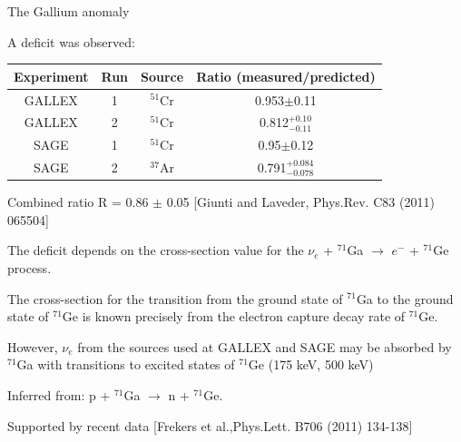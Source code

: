 %
%
%

\begin{frame}[t]{The Gallium anomaly}

A deficit was observed:\\
\begin{table}[ht]
 \centering
 \begin{tabular}{| c | c | c | c |}
   \hline
   Experiment &  Run &  Source     & Ratio (measured/predicted) \\
   \hline
   GALLEX     &    1 &  $^{51}$Cr  & 0.953$\pm$0.11             \\
   GALLEX     &    2 &  $^{51}$Cr  & 0.812$^{+0.10}_{-0.11}$    \\
   SAGE       &    1 &  $^{51}$Cr  & 0.95$\pm$0.12              \\
   SAGE       &    2 &  $^{37}$Ar  & 0.791$^{+0.084}_{-0.078}$  \\
   \hline
 \end{tabular}
\end{table}
Combined ratio R = 0.86 $\pm$ 0.05 {\scriptsize \color{blue}[Giunti and Laveder, Phys.Rev. C83 (2011) 065504]}\\
\vspace{0.1cm}
\begin{itemize}
{\scriptsize
  \item The deficit depends on the cross-section value for the
            {\color{red}$\nu_{e}$ + $^{71}$Ga $\rightarrow$ $e^{-}$ + $^{71}$Ge} process.
  \item The cross-section for the transition from the ground state of $^{71}$Ga to the ground state of
            $^{71}$Ge is known precisely from the electron capture decay rate of $^{71}$Ge.
  \item  However, $\nu_{e}$ from the sources used at GALLEX and SAGE may be absorbed by $^{71}$Ga
             with transitions to excited states of $^{71}$Ge (175 keV,
             500 keV)
             \begin{itemize}
                 {\scriptsize
                    \item Inferred from: p + $^{71}$Ga $\rightarrow$ n + $^{71}$Ge.
                    \item Supported by recent data {\color{blue}[Frekers et al.,Phys.Lett. B706 (2011) 134-138]}
                 }
             \end{itemize}
}
\end{itemize}
\end{frame}


%


